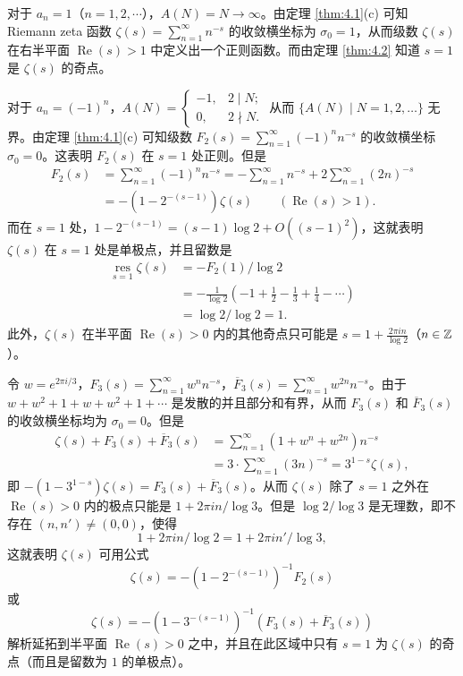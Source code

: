 \begin{example}
对于 $a_n=1$（$n=1,2,\cdots$），$A(N)=N\to\infty$。由定理 \ref{thm:4.1}(c) 可知 Riemann zeta 函数 $\zeta(s)=\sum_{n=1}^{\infty}n^{-s}$ 的收敛横坐标为 $\sigma_0=1$，从而级数 $\zeta(s)$ 在右半平面 $\operatorname{Re}(s)>1$ 中定义出一个正则函数。而由定理 \ref{thm:4.2} 知道 $s=1$ 是 $\zeta(s)$ 的奇点。
\end{example}

\begin{example}
对于 $a_n=(-1)^n$，$A(N)=\begin{cases}-1, & 2\mid N;\\ 0, & 2\nmid N.\end{cases}$ 从而 $\{A(N)\mid N=1,2,\dots\}$ 无界。由定理 \ref{thm:4.1}(c) 可知级数 $F_2(s)=\sum_{n=1}^{\infty}(-1)^nn^{-s}$ 的收敛横坐标 $\sigma_0=0$。这表明 $F_2(s)$ 在 $s=1$ 处正则。但是
\begin{align*}
  F_2(s)&=\sum_{n=1}^{\infty}(-1)^nn^{-s}=-\sum_{n=1}^{\infty}n^{-s}+2\sum_{n=1}^{\infty}(2n)^{-s}\\
&=-(1-2^{-(s-1)})\zeta(s)\qquad(\operatorname{Re}(s)>1).
\end{align*}
而在 $s=1$ 处，$1-2^{-(s-1)}=(s-1)\log 2+O((s-1)^2)$，这就表明 $\zeta(s)$ 在 $s=1$ 处是单极点，并且留数是
\begin{align*}
  \underset{s=1}{\operatorname{res}}\zeta(s)&=-F_2(1)/\log 2\\
  &=-\frac{1}{\log 2}\left(-1+\frac{1}{2}-\frac{1}{3}+\frac{1}{4}-\cdots\right)\\
  &=\log 2/\log 2=1.
\end{align*}
此外，$\zeta(s)$ 在半平面 $\operatorname{Re}(s)>0$ 内的其他奇点只可能是 $s=1+\frac{2\pi in}{\log 2}$（$n\in\mathbb{Z}$）。
\end{example}

\begin{example}
令 $w=e^{2\pi i/3}$，$F_3(s)=\sum_{n=1}^{\infty}w^nn^{-s}$，$\overline{F}_3(s)=\sum_{n=1}^{\infty}w^{2n}n^{-s}$。由于 $w+w^2+1+w+w^2+1+\cdots$ 是发散的并且部分和有界，从而 $F_3(s)$ 和 $\overline{F}_3(s)$ 的收敛横坐标均为 $\sigma_0=0$。但是
\begin{align*}
  \zeta(s)+F_3(s)+\overline{F}_3(s)&=\sum_{n=1}^{\infty}(1+w^n+w^{2n})n^{-s}\\
  &=3\cdot\sum_{n=1}^{\infty}(3n)^{-s}=3^{1-s}\zeta(s),
\end{align*}
即 $-(1-3^{1-s})\zeta(s)=F_3(s)+\overline{F}_3(s)$。从而 $\zeta(s)$ 除了 $s=1$ 之外在 $\operatorname{Re}(s)>0$ 内的极点只能是 $1+2\pi in/\log 3$。但是 $\log 2/\log 3$ 是无理数，即不存在 $(n,n')\neq(0,0)$，使得
\[
  1+2\pi in/\log 2=1+2\pi in'/\log 3,
\]
这就表明 $\zeta(s)$ 可用公式
\[
  \zeta(s)=-(1-2^{-(s-1)})^{-1}F_2(s)
\]
或
\[
  \zeta(s)=-(1-3^{-(s-1)})^{-1}(F_3(s)+\overline{F}_3(s))
\]
解析延拓到半平面 $\operatorname{Re}(s)>0$ 之中，并且在此区域中只有 $s=1$ 为 $\zeta(s)$ 的奇点（而且是留数为 $1$ 的单极点）。
\end{example}

